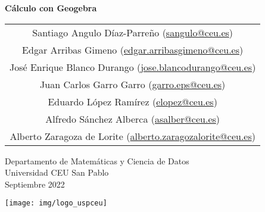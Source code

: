 \begin{titlepage}
\thispagestyle{empty}
\vspace*{7cm}
\par

\begin{center}
\normalfont\fontsize{30}{30}\selectfont
{\bfseries \color{blueceu}Cálculo con Geogebra}
\end{center}
\vspace{1cm}

\begin{center}
\Large
\begin{tabular}{c}
Santiago Angulo Díaz-Parreño (\url{sangulo@ceu.es})\\
Edgar Arribas Gimeno (\url{edgar.arribasgimeno@ceu.es})\\
José Enrique Blanco Durango (\url{jose.blancodurango@ceu.es})\\
Juan Carlos Garro Garro (\url{garro.eps@ceu.es})\\
Eduardo López Ramírez (\url{elopez@ceu.es})\\
Alfredo Sánchez Alberca (\url{asalber@ceu.es})\\
Alberto Zaragoza de Lorite (\url{alberto.zaragozalorite@ceu.es})

\end{tabular}

\medskip 
Departamento de Matemáticas y Ciencia de Datos\\ Universidad CEU San Pablo\\[1cm]
\medskip 
Septiembre 2022

\vspace{1cm}
\texttt{[image: img/logo\_uspceu]}
\end{center}
\vfill
\end{titlepage}
